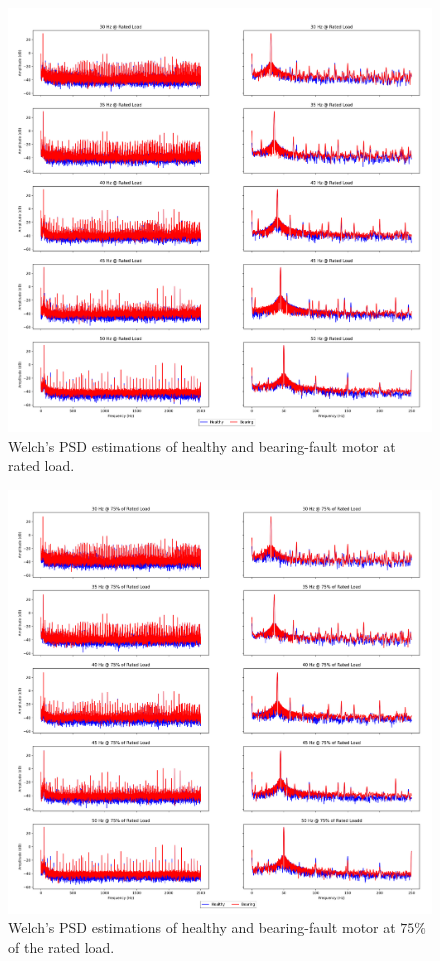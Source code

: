 \begin{figure}[p]
	\centering
	\includegraphics[width=0.75\paperwidth,keepaspectratio=true]{./fig/psdbearing_100.png}
	\caption{Welch's PSD estimations of healthy and bearing-fault motor at rated load.}	
	\label{psdbearing100}
\end{figure}
\pagebreak
\begin{figure}[p]
	\centering
	\includegraphics[width=0.75\paperwidth,keepaspectratio=true]{./fig/psdbearing_75.png}
	\caption{Welch's PSD estimations of healthy and bearing-fault motor at $75\%$ of the rated load.}	
	\label{psdbearing75}
\end{figure}
